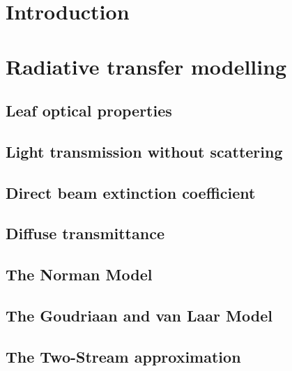 \documentclass[
  oneside]{book}
\begin{document}

\hypertarget{introduction}{%
\section{Introduction}\label{introduction}}

\hypertarget{radiative-transfer-modelling}{%
\section{Radiative transfer modelling}\label{radiative-transfer-modelling}}

\hypertarget{leaf-optical-properties}{%
\subsection{Leaf optical properties}\label{leaf-optical-properties}}

\hypertarget{light-transmission-without-scattering}{%
\subsection{Light transmission without scattering}\label{light-transmission-without-scattering}}

\hypertarget{direct-beam-extinction-coefficient}{%
\subsection{Direct beam extinction coefficient}\label{direct-beam-extinction-coefficient}}

\hypertarget{diffuse-transmittance}{%
\subsection{Diffuse transmittance}\label{diffuse-transmittance}}

\hypertarget{the-norman-model}{%
\subsection{The Norman Model}\label{the-norman-model}}

\hypertarget{the-goudriaan-and-van-laar-model}{%
\subsection{The Goudriaan and van Laar Model}\label{the-goudriaan-and-van-laar-model}}

\hypertarget{the-two-stream-approximation}{%
\subsection{The Two-Stream approximation}\label{the-two-stream-approximation}}
\end{document}
